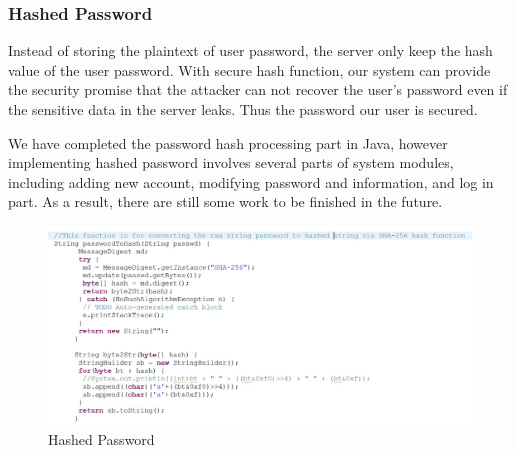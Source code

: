 \subsubsection{Hashed Password}
Instead of storing the plaintext of user password, the server only keep the hash value of the user password. With secure hash function, our system can provide the security promise that the attacker can not recover the user’s password even if the sensitive data in the server leaks. Thus the password our user is secured.

We have completed the password hash processing part in Java, however implementing hashed password involves several parts of system modules, including adding new account, modifying password and information, and log in part. As a result, there are still some work to be finished in the future.

\begin{figure}[H]
    \centering
    \includegraphics[width=\textwidth]{sp/sp02.jpg}
    \caption{Hashed Password}
    \label{fig:s02}
\end{figure}